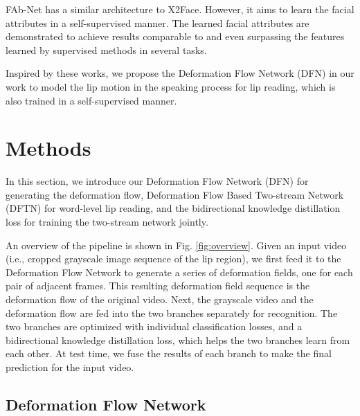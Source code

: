 \documentclass[a4paper, 10pt, conference]{ieeeconf}      \usepackage{FG2020}
\begin{document}
 FAb-Net \cite{Koepke2018SelfsupervisedLO} has a similar architecture to X2Face. However, it aims to learn the facial attributes in a self-supervised manner. 
The learned facial attributes are demonstrated to achieve results comparable to and even surpassing the features learned by supervised methods in several tasks. 
 
 Inspired by these works, we propose the Deformation Flow Network (DFN) in our work  to model the lip motion in the speaking process for lip reading, which is also trained in a self-supervised manner.








 


 
 






\section{Methods}
 \label{sec:methods}
 
 In this section, we introduce our Deformation Flow Network (DFN) for generating the deformation flow, Deformation Flow Based Two-stream Network (DFTN) for word-level lip reading, and the bidirectional knowledge distillation loss for training the two-stream network jointly. 
 
 An overview of the pipeline is shown in Fig. \ref{fig:overview}. Given an input video (i.e., cropped grayscale image sequence of the lip region), we first feed it to the Deformation Flow Network to generate a series of deformation fields, one for each pair of adjacent frames. This resulting deformation field sequence is the deformation flow of the original video. 
 Next, the grayscale video and the deformation flow are fed into the two branches separately for recognition. 
 The two branches are optimized with individual classification losses, and a bidirectional knowledge distillation loss, which helps the two branches learn from each other.  At test time, we fuse the results of each branch to make the final prediction for the input video.
 


 \subsection{Deformation Flow Network}
 \label{sec:dfn}
 
\end{document}
